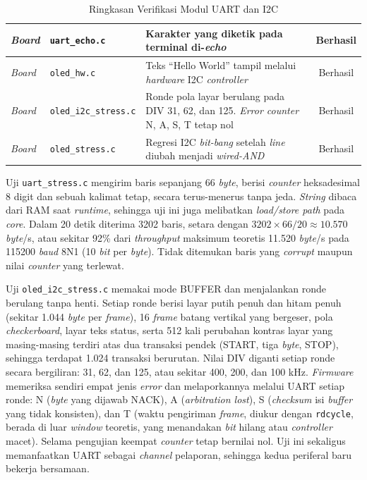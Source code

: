 \begin{table}[H]
\begin{tabular}{|p{1.4cm}|p{4.2cm}|p{6.0cm}|c|}
		\textit{Board} & \texttt{uart\_echo.c} & Karakter yang diketik pada terminal di-\textit{echo} & Berhasil \\ \hline
		\textit{Board} & \texttt{oled\_hw.c} & Teks ``Hello World'' tampil melalui \textit{hardware} I2C \textit{controller} & Berhasil \\ \hline
		\textit{Board} & \texttt{oled\_i2c\_stress.c} & Ronde pola layar berulang pada DIV 31, 62, dan 125. \textit{Error counter} N, A, S, T tetap nol & Berhasil \\ \hline
		\textit{Board} & \texttt{oled\_stress.c} & Regresi I2C \textit{bit-bang} setelah \textit{line} diubah menjadi \textit{wired-AND} & Berhasil \\ \hline
	\end{tabular}
	\normalsize
	\vspace{0.5em}
	\caption{Ringkasan Verifikasi Modul UART dan I2C}
	\label{Tab: Verifikasi UART I2C}
\end{table}

Uji \texttt{uart\_stress.c} mengirim baris sepanjang 66 \textit{byte}, berisi \textit{counter} heksadesimal 8 digit dan sebuah kalimat tetap, secara terus-menerus tanpa jeda. \textit{String} dibaca dari RAM saat \textit{runtime}, sehingga uji ini juga melibatkan \textit{load/store path} pada \textit{core}. Dalam 20 detik diterima 3202 baris, setara dengan $3202 \times 66 / 20 \approx 10.570$ \textit{byte}/s, atau sekitar 92\% dari \textit{throughput} maksimum teoretis 11.520 \textit{byte}/s pada 115200 \textit{baud} 8N1 (10 \textit{bit} per \textit{byte}). Tidak ditemukan baris yang \textit{corrupt} maupun nilai \textit{counter} yang terlewat.

Uji \texttt{oled\_i2c\_stress.c} memakai mode BUFFER dan menjalankan ronde berulang tanpa henti. Setiap ronde berisi layar putih penuh dan hitam penuh (sekitar 1.044 \textit{byte} per \textit{frame}), 16 \textit{frame} batang vertikal yang bergeser, pola \textit{checkerboard}, layar teks status, serta 512 kali perubahan kontras layar yang masing-masing terdiri atas dua transaksi pendek (START, tiga \textit{byte}, STOP), sehingga terdapat 1.024 transaksi berurutan. Nilai DIV diganti setiap ronde secara bergiliran: 31, 62, dan 125, atau sekitar 400, 200, dan 100 kHz. \textit{Firmware} memeriksa sendiri empat jenis \textit{error} dan melaporkannya melalui UART setiap ronde: N (\textit{byte} yang dijawab NACK), A (\textit{arbitration lost}), S (\textit{checksum} isi \textit{buffer} yang tidak konsisten), dan T (waktu pengiriman \textit{frame}, diukur dengan \texttt{rdcycle}, berada di luar \textit{window} teoretis, yang menandakan \textit{bit} hilang atau \textit{controller} macet). Selama pengujian keempat \textit{counter} tetap bernilai nol. Uji ini sekaligus memanfaatkan UART sebagai \textit{channel} pelaporan, sehingga kedua periferal baru bekerja bersamaan.

